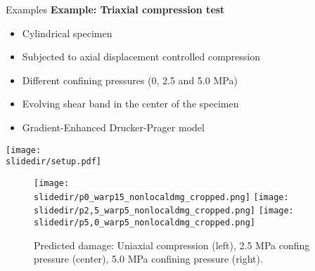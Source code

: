 
\begin{frame}{Examples}
    \textbf{Example: Triaxial compression test}
\begin{minipage}{1.0\textwidth}
\begin{minipage}{0.55\textwidth}
    \begin{itemize}
        \item Cylindrical specimen
        \item Subjected to axial displacement controlled compression
        \item Different confining pressures (0, 2.5 and 5.0 MPa)
        \item Evolving shear band in the center of the specimen
        \item Gradient-Enhanced Drucker-Prager model
    \end{itemize}
\end{minipage}\hfill{}%
\begin{minipage}{0.4\textwidth}
    \centering
    \texttt{[image: \\slidedir/setup.pdf]}
\end{minipage}
\end{minipage}
\vfill

\begin{minipage}{1.0\textwidth}
    \begin{figure}[htpb]
        \centering
    \texttt{[image: \\slidedir/p0\_warp15\_nonlocaldmg\_cropped.png]}%
    \hspace{1cm}%
    \texttt{[image: \\slidedir/p2,5\_warp5\_nonlocaldmg\_cropped.png]}%
    \hspace{1cm}%
    \texttt{[image: \\slidedir/p5,0\_warp5\_nonlocaldmg\_cropped.png]}%
    \caption{Predicted damage: Uniaxial compression (left), 2.5 MPa confing pressure (center), 5.0 MPa confining pressure (right).} 
        \label{fig:name}
    \end{figure}
\end{minipage}
\end{frame}
